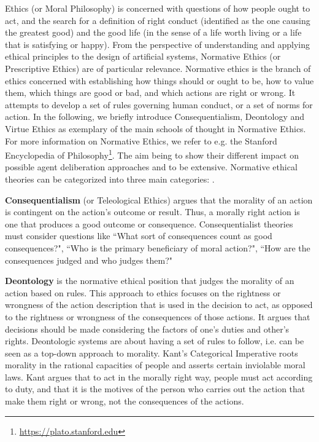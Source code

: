 \documentclass[twocolumn]{article}
\begin{document}


Ethics (or Moral Philosophy) is concerned with questions of how people ought to act, and the search for a definition of right conduct (identified as the one causing the greatest good) and the good life (in the sense of a life worth living or a life that is satisfying or happy). From the perspective of understanding and applying ethical principles to the design of artificial systems, Normative Ethics (or Prescriptive Ethics) are of particular relevance. Normative ethics is the branch of ethics concerned with establishing how things should or ought to be, how to value them, which things are good or bad, and which actions are right or wrong. It attempts to develop a set of rules governing human conduct, or a set of norms for action. 
In the following, we briefly  introduce Consequentialism, Deontology and Virtue Ethics as exemplary of the main schools of thought in Normative Ethics. For more information on Normative Ethics, we refer to e.g. the Stanford Encyclopedia of Philosophy\footnote{\url{https://plato.stanford.edu}}.
The aim being to show their different impact on possible agent deliberation approaches and to be extensive. %
Normative ethical theories can be categorized into three main categories: .  %

\textbf{Consequentialism} (or Teleological Ethics) argues that the morality of an action is contingent on the action's outcome or result. Thus, a morally right action is one that produces a good outcome or consequence. Consequentialist theories must consider questions like ``What sort of consequences count as good consequences?", ``Who is the primary beneficiary of moral action?", ``How are the consequences judged and who judges them?"

\textbf{Deontology}  is the normative ethical position that judges the morality of an action based on rules. This approach to ethics focuses on the rightness or wrongness of the action description that is used in the decision to act, as opposed to the rightness or wrongness of the consequences of those actions. It argues that decisions should be made considering the factors of one's duties and other's rights. Deontologic systems are about having a set of rules to follow, i.e. can be seen as a top-down approach to morality. Kant's Categorical Imperative roots morality in the rational capacities of people and asserts certain inviolable moral laws. Kant argues that to act in the morally right way, people must act according to duty, and that it is the motives of the person who carries out the action that make them right or wrong, not the consequences of the actions. 
\end{document}
